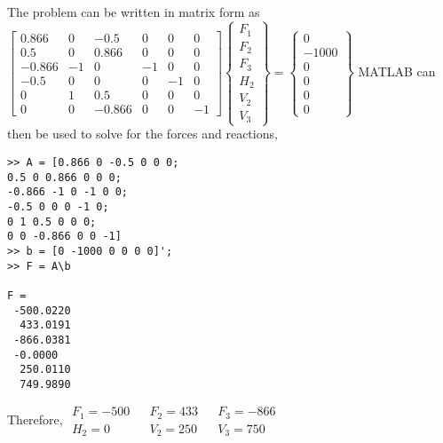 \documentclass[../main.tex]{subfiles}
\begin{document}
\begin{enumerate}[label=\bfseries(\alph*)]
\section{}
The problem can be written in matrix form as
\bigbreak
$\left[\begin{array}{cccccc}
0.866 & 0 & -0.5 & 0 & 0 & 0 \\
0.5 & 0 & 0.866 & 0 & 0 & 0 \\
-0.866 & -1 & 0 & -1 & 0 & 0 \\
-0.5 & 0 & 0 & 0 & -1 & 0 \\
0 & 1 & 0.5 & 0 & 0 & 0 \\
0 & 0 & -0.866 & 0 & 0 & -1
\end{array}\right]\left\{\begin{array}{c}
F_{1} \\
F_{2} \\
F_{3} \\
H_{2} \\
V_{2} \\
V_{3}
\end{array}\right\}=\left\{\begin{array}{c}
0 \\
-1000 \\
0 \\
0 \\
0 \\
0
\end{array}\right\}$
\bigbreak
MATLAB can then be used to solve for the forces and reactions,
\begin{lstlisting}[numbers=none]
>> A = [0.866 0 -0.5 0 0 0;
0.5 0 0.866 0 0 0;
-0.866 -1 0 -1 0 0;
-0.5 0 0 0 -1 0;
0 1 0.5 0 0 0;
0 0 -0.866 0 0 -1]
>> b = [0 -1000 0 0 0 0]';
>> F = A\b

F =
 -500.0220
  433.0191
 -866.0381
 -0.0000
  250.0110
  749.9890
\end{lstlisting}
\bigbreak
Therefore,
\bigbreak
$\begin{array}{llllll}
F_{1}=-500 && F_{2}=433 && F_{3}=-866 \\
H_{2}=0 && V_{2}=250 && V_{3}=750 
\end{array}$
\bigbreak



\end{enumerate}
\end{document}
